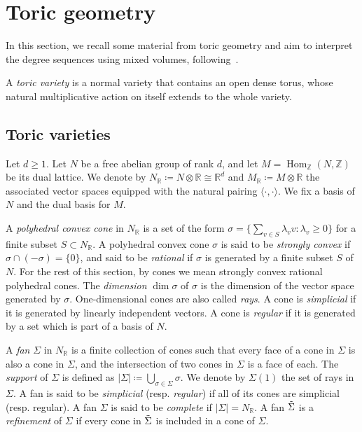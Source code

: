 \documentclass[11pt,a4paper]{article}
\theoremstyle{plain}
\theoremstyle{remark}
\theoremstyle{custombold}
\DeclareMathOperator{\Hom}{Hom}
\begin{document}
\section{Toric geometry}


In this section, we recall some material from toric geometry and aim to interpret the degree sequences using mixed volumes, following~\cite{Oda-toric-geometry}.

A \emph{toric variety} is a normal variety that contains an open dense torus, whose natural multiplicative action on itself extends to the whole variety.
\subsection{Toric varieties}


Let $d\geq 1$. Let $N$ be a free abelian group of rank $d$, and let $M=\Hom_\mathbb Z(N,\mathbb Z)$ be its dual lattice. We denote by $N_\mathbb R\coloneqq N\otimes\mathbb R\cong \mathbb R^d$ and $M_\mathbb R\coloneqq M\otimes\mathbb R$ the associated vector spaces equipped with the natural pairing $\langle\cdot,\cdot\rangle$. We fix a basis of $N$ and the dual basis for $M$.

A \emph{polyhedral convex cone} in $N_\mathbb R$ is a set of the form $\sigma=\Big\{\sum_{v\in S}\lambda_vv:\lambda_v\geq0\Big\}$ for a finite subset $S\subset N_\mathbb R$. A polyhedral convex cone $\sigma$ is said to be \emph{strongly convex} if $\sigma\cap(-\sigma)=\{0\}$, and said to be \emph{rational} if $\sigma$ is generated by a finite subset $S$ of $N$. For the rest of this section, by cones we mean strongly convex rational polyhedral cones. The \emph{dimension} $\dim\sigma$ of $\sigma$ is the dimension of the vector space generated by $\sigma$. One-dimensional cones are also called \emph{rays}. A cone is \emph{simplicial} if it is generated by linearly independent vectors. A cone is \emph{regular} if it is generated by a set which is part of a basis of $N$. 

A \emph{fan} $\Sigma$ in $N_\mathbb R$ is a finite collection of cones such that every face of a cone in $\Sigma$ is also a cone in $\Sigma$, and the intersection of two cones in $\Sigma$ is a face of each. The \emph{support} of $\Sigma$ is defined as 
$|\Sigma|\coloneqq \bigcup_{\sigma\in\Sigma}\sigma$. We denote by $\Sigma(1)$ the set of rays in $\Sigma$. A fan is said to be \emph{simplicial} (resp. \emph{regular})  if all of its cones are simplicial (resp. regular). A fan $\Sigma$ is said to be \emph{complete} if $|\Sigma|=N_\mathbb R$. 
 A fan $\Tilde{\Sigma}$ is a \emph{refinement} of $\Sigma$ if every cone in $\Tilde{\Sigma}$ is included in a cone of $\Sigma$.
 
\end{document}
